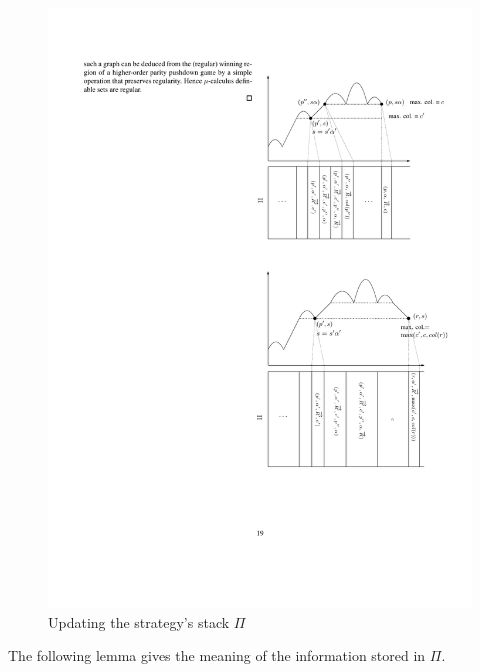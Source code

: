 \begin{figure}
\begin{center}

\includegraphics{./pile_update.pdf}
\caption{Updating the strategy's stack $\Pi$}\label{11-fig:mise_a_jour_pile_strategie}
\end{center}
\end{figure}

The following lemma gives the meaning of the information stored
in $\Pi$.


